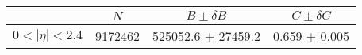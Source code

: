 \begin{tabular}{lccc}
\hline
    &   $N$   & $B \pm \delta B$  &  $C \pm \delta C$ \\
\hline
$0 < |\eta| <2.4$              & 9172462    & 525052.6   $\pm$ 27459.2 & 0.659      $\pm$ 0.005 \\
\hline
\end{tabular}
